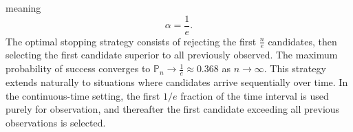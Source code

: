 \begin{example}
\begin{equation}
	\end{equation}
	meaning
	\begin{equation}
		\alpha = \frac{1}{e}.
	\end{equation}
	The optimal stopping strategy consists of rejecting the first $\frac{n}{e}$ candidates, then selecting the first candidate superior to all previously observed. The maximum probability of success converges to $\mathbb{P}_n \to \frac{1}{e} \approx 0.368$ as $n \to \infty$. This strategy extends naturally to situations where candidates arrive sequentially over time. In the continuous-time setting, the first $1/e$ fraction of the time interval is used purely for observation, and thereafter the first candidate exceeding all previous observations is selected.
\end{example}